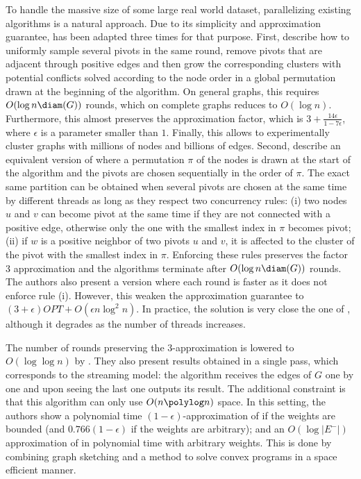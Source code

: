 \begin{aside}
To handle the massive size of some large real world dataset, parallelizing existing algorithms is a
natural approach. Due to its simplicity and approximation guarantee, \ccpivot{} has been adapted
three times for that purpose. First, \textcite{Chierichetti2014} describe how to uniformly sample
several pivots in the same round, remove pivots that are adjacent through positive edges and then
grow the corresponding clusters with potential conflicts solved according to the node order in a
global permutation drawn at the beginning of the algorithm. On general graphs, this requires $O(\log
n\diam(G))$ rounds, which on complete graphs reduces to $O(\log n)$.
Furthermore, this almost preserves the approximation factor, which is
$3+\frac{14\epsilon}{1-7\epsilon}$, where $\epsilon$ is a parameter smaller than $1$. Finally, this
allows to experimentally cluster graphs with millions of nodes and billions of edges. Second,
\textcite{ParallelCCNIPS15} describe an equivalent version of \ccpivot{} where a permutation $\pi$
of the nodes is drawn at the start of the algorithm and the pivots are chosen sequentially in the
order of $\pi$. The exact same partition can be obtained when several pivots are chosen at the same
time by different threads as long as they respect two concurrency rules: (i) two nodes $u$ and $v$
can become pivot at the same time if they are not connected with a positive edge, otherwise only the
one with the smallest index in $\pi$ becomes pivot; (ii) if $w$ is a positive neighbor of two pivots
$u$ and $v$, it is affected to the cluster of the pivot with the smallest index in $\pi$. Enforcing
these rules preserves the factor $3$ approximation and the algorithms terminate after $O(\log
n\diam(G))$ rounds. The authors also present a version where each round is faster as it does not
enforce rule (i). However, this weaken the approximation guarantee to $(3 + \epsilon)OPT +
O(\epsilon n\log^2 n)$. In practice, the solution is very close the one of \ccpivot{}, although it
degrades as the number of threads increases.

The number of rounds preserving the $3$-approximation
is lowered to $O(\log\log n)$ by \textcite{Ahn2015}. They also present results obtained in a single
pass, which corresponds to the streaming model: the algorithm receives the edges of $G$ one by one
and upon seeing the last one outputs its result. The additional constraint is that this algorithm
can only use $O(n\polylog n)$ space. In this setting, the authors show a polynomial time
$(1-\epsilon)$-approximation of \maxa{} if the weights are bounded (and $0.766(1-\epsilon)$ if the
weights are arbitrary); and an $O(\log |E^-|)$ approximation of \mind{} in polynomial time with arbitrary
weights. This is done by combining graph sketching and a method to solve convex programs in a space
efficient manner.


\end{aside}
